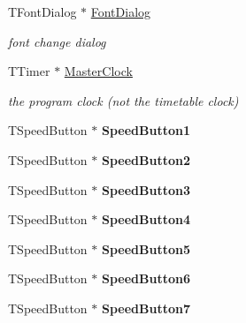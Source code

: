 \begin{DoxyCompactItemize}
T\+Font\+Dialog $\ast$ \mbox{\hyperlink{class_t_interface_a60a9276c65b1612112ea2dd020ea353c}{Font\+Dialog}}
\begin{DoxyCompactList}\small\item\em font change dialog \end{DoxyCompactList}\item 
\mbox{\label{class_t_interface_a86ed4cb82f825abe93c1df870d2bf4d2}} 
T\+Timer $\ast$ \mbox{\hyperlink{class_t_interface_a86ed4cb82f825abe93c1df870d2bf4d2}{Master\+Clock}}
\begin{DoxyCompactList}\small\item\em the program clock (not the timetable clock) \end{DoxyCompactList}\item 
\mbox{\label{class_t_interface_aec3fdfb6671fe92b1858d1deb5d9156a}} 
T\+Speed\+Button $\ast$ {\bfseries Speed\+Button1}
\item 
\mbox{\label{class_t_interface_a54ddc802547860142f7dfe8929c57b66}} 
T\+Speed\+Button $\ast$ {\bfseries Speed\+Button2}
\item 
\mbox{\label{class_t_interface_abb3c3fdc2b7723531ef0c3c937561f6f}} 
T\+Speed\+Button $\ast$ {\bfseries Speed\+Button3}
\item 
\mbox{\label{class_t_interface_a5be15e255b615bc628f5fbf0ed6e4a58}} 
T\+Speed\+Button $\ast$ {\bfseries Speed\+Button4}
\item 
\mbox{\label{class_t_interface_ace77f7d60b09aac528d6ea747c221ca5}} 
T\+Speed\+Button $\ast$ {\bfseries Speed\+Button5}
\item 
\mbox{\label{class_t_interface_ac5d64e9e9f8cc4dac6ae4ffe51d86f3c}} 
T\+Speed\+Button $\ast$ {\bfseries Speed\+Button6}
\item 
\mbox{\label{class_t_interface_aaa3c803c41b5d1c38783587ddc38513f}} 
T\+Speed\+Button $\ast$ {\bfseries Speed\+Button7}
\item 
\mbox{\label{class_t_interface_a2d48d17391af301e338e79a290824a64}} 

\end{DoxyCompactItemize}
